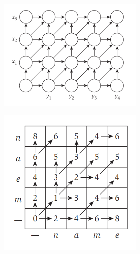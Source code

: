 \begin{figure}[H]
	\begin{subfigure}{\textwidth}
		\centering
		\begin{subfigure}{.5\textwidth}
			\centering
			\includegraphics[width=\linewidth, keepaspectratio]{Programmazione_dinamica/imgs/sa.png}
		\end{subfigure}%
		\begin{subfigure}{.5\textwidth}
			\centering
			\includegraphics[width=\linewidth, keepaspectratio]{Programmazione_dinamica/imgs/seqalignmatrix.png}
		\end{subfigure}%
	\end{subfigure}
\end{figure}

